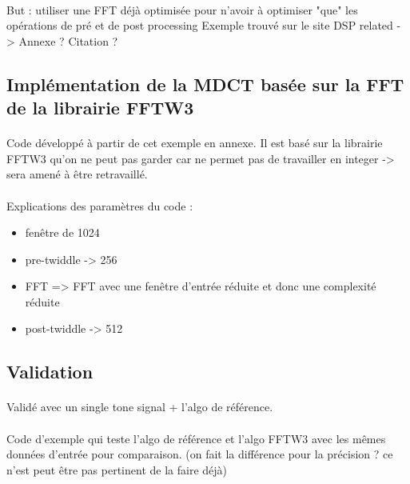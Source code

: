 \documentclass{article}
\begin{document}
    \paragraph{}
    But : utiliser une FFT déjà optimisée pour n'avoir à optimiser "que" les opérations de pré et de post processing
    Exemple trouvé sur le site DSP related -> Annexe ? Citation ?

    \subsection{Implémentation de la MDCT basée sur la FFT de la librairie FFTW3}
    \paragraph{}
    Code développé à partir de cet exemple en annexe. Il est basé sur la librairie FFTW3 qu'on ne peut pas garder car ne permet pas de travailler en integer -> sera amené à être retravaillé.

    \paragraph{}
    Explications des paramètres du code :
    \begin{itemize}
        \item fenêtre de 1024
        \item pre-twiddle -> 256
        \item FFT => FFT avec une fenêtre d'entrée réduite et donc une complexité réduite
        \item post-twiddle -> 512
    \end{itemize}


    \subsection{Validation}
    \paragraph{}
    Validé avec un single tone signal + l'algo de référence.

    \paragraph{}
    Code d'exemple qui teste l'algo de référence et l'algo FFTW3 avec les mêmes données d'entrée pour comparaison. (on fait la différence pour la précision ? ce n'est peut être pas pertinent de la faire déjà)
\end{document}
